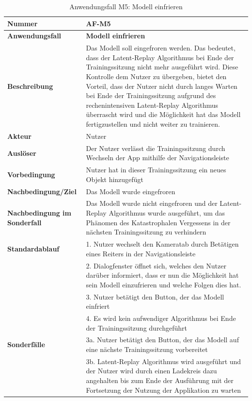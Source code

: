 \documentclass[oneside]{ausarbeitung}
\begin{document}
\begin{table}[htbp]
	\centering
	\begin{tabular}{|l|p{80mm}|}
		\hline
		\textbf{Nummer} & \textbf{AF-M5} \\ \hline
		\textbf{Anwendungsfall} & \textbf{Modell einfrieren} \\ \hline
		\textbf{Beschreibung} & Das Modell soll eingefroren werden. Das bedeutet, dass der Latent-Replay Algorithmus bei Ende der Trainingssitzung nicht mehr ausgeführt wird. Diese Kontrolle dem Nutzer zu übergeben, bietet den Vorteil, dass der Nutzer nicht durch langes Warten bei Ende der Trainingssitzung aufgrund des rechenintensiven Latent-Replay Algorithmus überrascht wird und die Möglichkeit hat das Modell fertigzustellen und nicht weiter zu trainieren. \\ \hline
		\textbf{Akteur} & Nutzer \\ \hline
		\textbf{Auslöser} & Der Nutzer verlässt die Trainingssitzung durch Wechseln der App mithilfe der Navigationsleiste  \\ \hline
		\textbf{Vorbedingung} & Nutzer hat in dieser Trainingssitzung ein neues Objekt hinzugefügt \\ \hline	
		\textbf{Nachbedingung/Ziel} & Das Modell wurde eingefroren \\ \hline
		\textbf{Nachbedingung im Sonderfall} & Das Modell wurde nicht eingefroren und der Latent-Replay Algorithmus wurde ausgeführt, um das Phänomen des Katastrophalen Vergessens in der nächsten Trainingssitzung zu verhindern \\ \hline
		\textbf{Standardablauf} & 1. Nutzer wechselt den Kameratab durch Betätigen eines Reiters in der Navigationsleiste \\
		& 2. Dialogfenster öffnet sich, welches den Nutzer darüber informiert, dass er nun die Möglichkeit hat sein Modell einzufrieren und welche Folgen dies hat. \\
		& 3. Nutzer betätigt den Button, der das Modell einfriert \\
		& 4. Es wird kein aufwendiger Algorithmus bei Ende der Trainingssitzung durchgeführt \\ \hline
		\textbf{Sonderfälle} & 3a. Nutzer betätigt den Button, der das Modell auf eine nächste Trainingssitzung vorbereitet \\
		& 3b. Latent-Replay Algorithmus wird ausgeführt und der Nutzer wird durch einen Ladekreis dazu angehalten bis zum Ende der Ausführung mit der Fortsetzung der Nutzung der Applikation zu warten \\ \hline
		
	\end{tabular}
	\caption{Anwendungsfall M5: Modell einfrieren}
	\label{tab:use-case-freeze-model}
\end{table}
\end{document}
